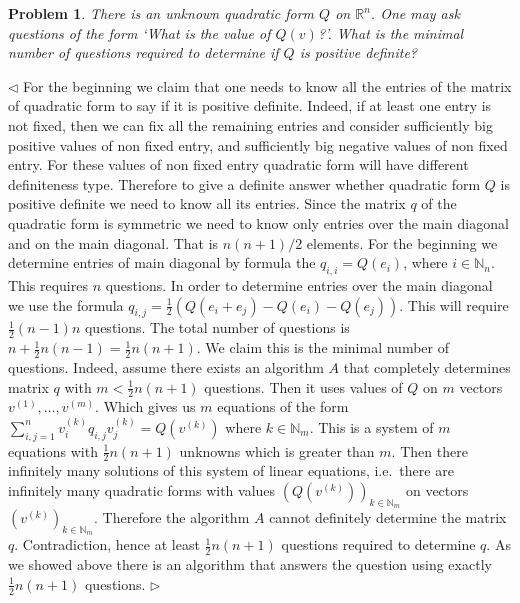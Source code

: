 \documentclass[12pt]{article}
\newtheorem{problem}{Problem}[subsection]
\newenvironment{solution}{\par $\triangleleft$}{$\triangleright$}
\begin{document}
\begin{problem} There is an unknown quadratic form $Q$ on $\mathbb{R}^n$. One
may ask questions of the form `What is the value of $Q(v)$?'. What is the
minimal number of questions required to determine if $Q$ is positive definite?
\end{problem}
\begin{solution} For the beginning we claim that one needs to know all the
    entries of the matrix of quadratic form to say if it is positive definite.
    Indeed, if at least one entry is not fixed, then we can fix all the
    remaining entries and consider sufficiently big positive values of non fixed
    entry, and sufficiently big negative values of non fixed entry. For these
    values of non fixed entry quadratic form will have different definiteness
    type. Therefore to give a definite answer whether quadratic form $Q$ is
    positive definite we need to know all its entries. Since the matrix $q$ of
    the quadratic form is symmetric we need to know only entries over the main
    diagonal and on the main diagonal. That is $n(n+1)/2$ elements. For the
    beginning we determine entries of main diagonal by formula the
    $q_{i,i}=Q(e_i)$, where $i\in\mathbb{N}_n$. This requires $n$ questions. In
    order to  determine entries over the main diagonal we use the formula
    $q_{i,j}=\frac{1}{2}(Q(e_i+e_j)-Q(e_i)-Q(e_j))$. This will require
    $\frac{1}{2}(n-1)n$ questions. The total number of questions is
    $n+\frac{1}{2}n(n-1)=\frac{1}{2}n(n+1)$. We claim this is the minimal number
    of questions. Indeed, assume there exists an algorithm $A$ that completely
    determines matrix $q$ with $m<\frac{1}{2}n(n+1)$ questions. Then it uses
    values of $Q$ on $m$ vectors $v^{(1)},\ldots,v^{(m)}$. Which gives us $m$
    equations of the form $\sum_{i,j=1}^n v_i^{(k)}q_{i,j}v_j^{(k)}=Q(v^{(k)})$
    where $k\in\mathbb{N}_m$. This is a system of $m$ equations with
    $\frac{1}{2}n(n+1)$ unknowns which is greater than $m$. Then there
    infinitely many solutions of this system of linear equations, i.e.\ there
    are infinitely many quadratic forms with values
    ${(Q(v^{(k)}))}_{k\in\mathbb{N}_m}$ on vectors
    ${(v^{(k)})}_{k\in\mathbb{N}_m}$. Therefore the algorithm $A$ cannot
    definitely determine the matrix $q$. Contradiction, hence at least
    $\frac{1}{2}n(n+1)$ questions required to determine $q$. As we showed above
    there is an algorithm that answers the question using exactly
    $\frac{1}{2}n(n+1)$ questions.
\end{solution}
\end{document}
